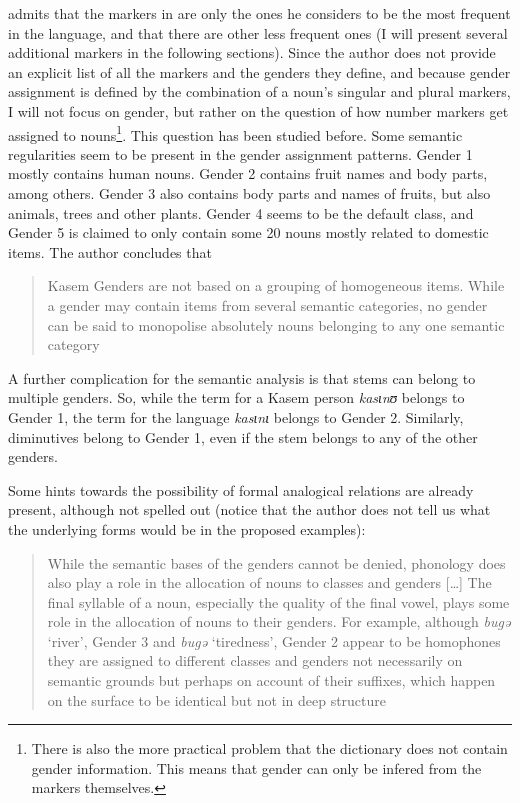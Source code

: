 \textcite[249]{Awedoba.1980} admits that the markers in  are only the ones he considers to be the most frequent in the language, and that there are other less frequent ones (I will present several additional markers in the following sections). Since the author does not provide an explicit list of all the markers and the genders they define, and because gender assignment is defined by the combination of a noun's singular and plural markers, I will not focus on gender, but rather on the question of how number markers get assigned to nouns\footnote{There is also the more practical problem that the dictionary does not contain gender information. This means that gender can only be infered from the markers themselves.}. This question has been studied before. Some semantic regularities seem to be present in the gender assignment patterns. Gender 1 mostly contains human nouns. Gender 2 contains fruit names and body parts, among others. Gender 3 also contains body parts and names of fruits, but also animals, trees and other plants. Gender 4 seems to be the default class, and Gender 5 is claimed to only contain some 20 nouns mostly related to domestic items. The author concludes that

\begin{quotation}
Kasem Genders are not based on a grouping of homogeneous items. While a gender may contain items from several semantic categories, no gender can be said to monopolise absolutely nouns belonging to any one semantic category \autocite[7]{Awedoba.2003}
\end{quotation}

A further complication for the semantic analysis is that stems can belong to multiple genders. So, while the term for a Kasem person \textit{kasɩnʊ} belongs to Gender 1, the term for the language \textit{kasɩnɩ} belongs to Gender 2. Similarly, diminutives belong to Gender 1, even if the stem belongs to any of the other genders.

Some hints towards the possibility of formal analogical relations are already present, although not spelled out (notice that the author does not tell us what the underlying forms would be in the proposed examples):

\begin{quotation}
  While the semantic bases of the genders cannot be denied, phonology  does also play a role in the allocation of nouns to classes and genders [\dots] The final syllable of a noun, especially the quality of the final vowel, plays some role in the allocation of nouns to their genders. For example, although \textit{bugə} `river', Gender 3 and \textit{bugə} `tiredness', Gender 2 appear to be homophones they are assigned to different classes and genders not necessarily on semantic grounds but perhaps on account of their suffixes, which happen on the surface to be identical but not in deep structure \autocite[12--13]{Awedoba.2003}
\end{quotation}

